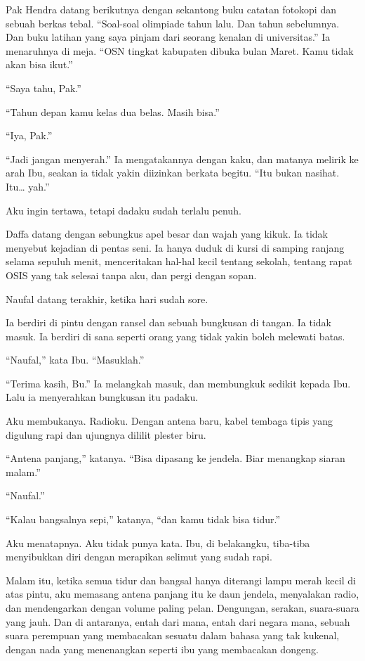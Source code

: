 \documentclass[11pt,twoside,openany]{book}
\begin{document}
Pak Hendra datang berikutnya dengan sekantong buku catatan fotokopi dan sebuah berkas tebal. ``Soal-soal olimpiade tahun lalu. Dan tahun sebelumnya. Dan buku latihan yang saya pinjam dari seorang kenalan di universitas.'' Ia menaruhnya di meja. ``OSN tingkat kabupaten dibuka bulan Maret. Kamu tidak akan bisa ikut.''

``Saya tahu, Pak.''

``Tahun depan kamu kelas dua belas. Masih bisa.''

``Iya, Pak.''

``Jadi jangan menyerah.'' Ia mengatakannya dengan kaku, dan matanya melirik ke arah Ibu, seakan ia tidak yakin diizinkan berkata begitu. ``Itu bukan nasihat. Itu\ldots{} yah.''

Aku ingin tertawa, tetapi dadaku sudah terlalu penuh.

Daffa datang dengan sebungkus apel besar dan wajah yang kikuk. Ia tidak menyebut kejadian di pentas seni. Ia hanya duduk di kursi di samping ranjang selama sepuluh menit, menceritakan hal-hal kecil tentang sekolah, tentang rapat OSIS yang tak selesai tanpa aku, dan pergi dengan sopan.

Naufal datang terakhir, ketika hari sudah sore.

Ia berdiri di pintu dengan ransel dan sebuah bungkusan di tangan. Ia tidak masuk. Ia berdiri di sana seperti orang yang tidak yakin boleh melewati batas.

``Naufal,'' kata Ibu. ``Masuklah.''

``Terima kasih, Bu.'' Ia melangkah masuk, dan membungkuk sedikit kepada Ibu. Lalu ia menyerahkan bungkusan itu padaku.

Aku membukanya. Radioku. Dengan antena baru, kabel tembaga tipis yang digulung rapi dan ujungnya dililit plester biru.

``Antena panjang,'' katanya. ``Bisa dipasang ke jendela. Biar menangkap siaran malam.''

``Naufal.''

``Kalau bangsalnya sepi,'' katanya, ``dan kamu tidak bisa tidur.''

Aku menatapnya. Aku tidak punya kata. Ibu, di belakangku, tiba-tiba menyibukkan diri dengan merapikan selimut yang sudah rapi.

Malam itu, ketika semua tidur dan bangsal hanya diterangi lampu merah kecil di atas pintu, aku memasang antena panjang itu ke daun jendela, menyalakan radio, dan mendengarkan dengan volume paling pelan. Dengungan, serakan, suara-suara yang jauh. Dan di antaranya, entah dari mana, entah dari negara mana, sebuah suara perempuan yang membacakan sesuatu dalam bahasa yang tak kukenal, dengan nada yang menenangkan seperti ibu yang membacakan dongeng.
\end{document}
